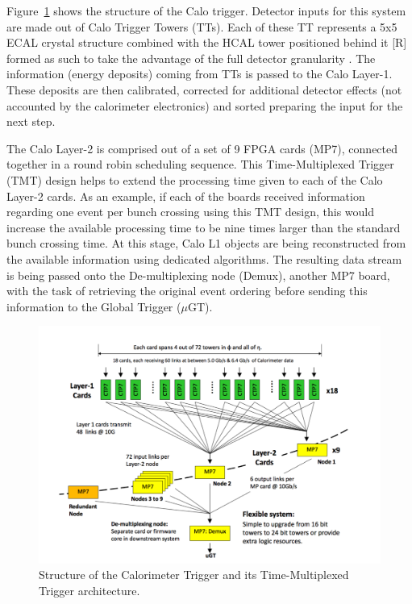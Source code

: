 \hspace{10pt} Figure~\ref{fig:l1_calo_trig} shows the structure of the Calo trigger. Detector inputs for this system are made out of Calo Trigger Towers (TTs). Each of these TT represents a 5x5 ECAL crystal structure combined with the HCAL tower positioned behind it [R] formed as such to take the advantage of the full detector granularity . The information (energy deposits) coming from TTs is passed to the Calo Layer-1. These deposits are then calibrated, corrected for additional detector effects (not accounted by the calorimeter electronics) and sorted preparing the input for the next step.

\hspace{10pt} The Calo Layer-2 is comprised out of a set of 9 FPGA cards (MP7), connected together in a round robin scheduling sequence. This Time-Multiplexed Trigger (TMT) design helps to extend the processing time given to each of the Calo Layer-2 cards. As an example, if each of the boards received information regarding one event per bunch crossing using this TMT design, this would increase the available processing time to be nine times larger than the standard bunch crossing time. At this stage, Calo L1 objects are being reconstructed from the available information using dedicated algorithms. The resulting data stream is being passed onto the De-multiplexing node (Demux), another MP7 board, with the task of retrieving the original event ordering before sending this information to the Global Trigger ($\mu$GT).
\begin{figure}[htbp]
  \centering
    \includegraphics[width=\textwidth]{CMS_experiment/L1_calo_trig.png}
  \caption{Structure of the Calorimeter Trigger and its Time-Multiplexed Trigger architecture.~\cite{cms:l1_paper}}
  \label{fig:l1_calo_trig}
\end{figure}

